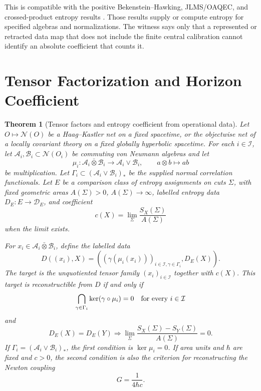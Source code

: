 \documentclass[12pt]{article}
\newtheorem{theorem}{Theorem}
\theoremstyle{definition}
\theoremstyle{remark}
\newcommand{\A}{\mathcal A}
\newcommand{\B}{\mathcal B}
\newcommand{\D}{\mathcal D}
\newcommand{\N}{\mathcal N}
\begin{document}
This is compatible with the positive Bekenstein--Hawking, JLMS/OAQEC, and
crossed-product entropy results \cite{Bekenstein,Hawking,JLMS,HarlowRT,DHW,
WittenCrossed,LongoWitten,CLPW,CPW}.  Those results supply or compute entropy
for specified algebras and normalizations.  The witness says only that a
represented or retracted data map that does not include the finite central
calibration cannot identify an absolute coefficient that counts it.

\section{Tensor Factorization and Horizon Coefficient}

\begin{theorem}[Tensor factors and entropy coefficient from operational data]
\label{thm:tensor-entropy}
Let \(O\mapsto\N(O)\) be a Haag--Kastler net on a fixed spacetime, or the
objectwise net of a locally covariant theory on a fixed globally hyperbolic
spacetime.  For each \(i\in\mathcal I\), let
\(\A_i,\B_i\subset\N(O_i)\) be commuting von Neumann algebras and let
\[
  \mu_i:\A_i\bar\otimes\B_i\to\A_i\vee\B_i,\qquad a\otimes b\mapsto ab
\]
be multiplication.  Let \(\Gamma_i\subset(\A_i\vee\B_i)_*\) be the supplied
normal correlation functionals.  Let \(E\) be a comparison class of entropy
assignments on cuts \(\Sigma\), with fixed geometric areas \(A(\Sigma)>0\),
\(A(\Sigma)\to\infty\), labelled entropy data \(D_E:E\to\D_E\), and coefficient
\[
  c(X)=\lim_{\Sigma}\frac{S_X(\Sigma)}{A(\Sigma)}
\]
when the limit exists.

For \(x_i\in\A_i\bar\otimes\B_i\), define the labelled data
\[
  D((x_i),X)=
  \left(
    (\gamma(\mu_i(x_i)))_{i\in\mathcal I,\gamma\in\Gamma_i},
    D_E(X)
  \right).
\]
The target is the unquotiented tensor family \((x_i)_{i\in\mathcal I}\)
together with \(c(X)\).  This target is reconstructible from \(D\) if and only
if
\[
  \bigcap_{\gamma\in\Gamma_i}\ker(\gamma\circ\mu_i)=0
  \quad\hbox{for every }i\in\mathcal I
\]
and
\[
  D_E(X)=D_E(Y)\Longrightarrow
  \lim_{\Sigma}\frac{S_X(\Sigma)-S_Y(\Sigma)}{A(\Sigma)}=0 .
\]
If \(\Gamma_i=(\A_i\vee\B_i)_*\), the first condition is \(\ker\mu_i=0\).  If
area units and \(\hbar\) are fixed and \(c>0\), the second condition is also the
criterion for reconstructing the Newton coupling
\[
  G=\frac{1}{4\hbar c}.
\]
\end{theorem}
\end{document}
